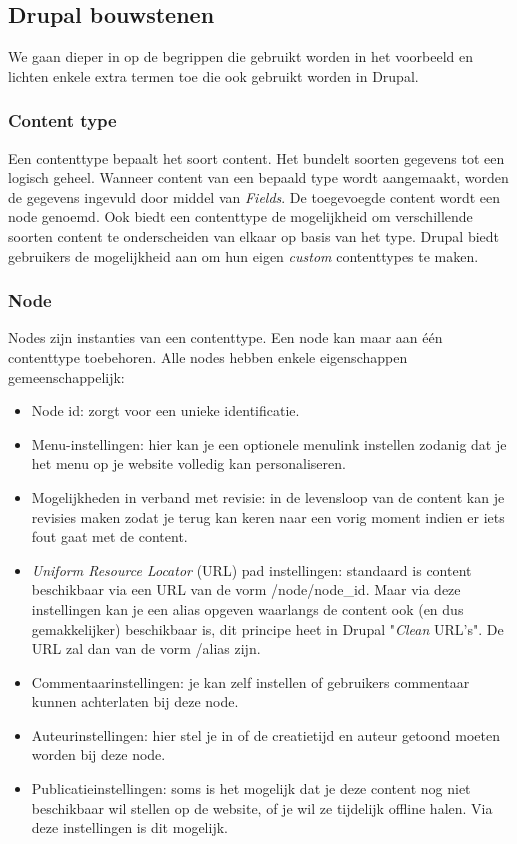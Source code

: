 \subsection{Drupal bouwstenen}

We gaan dieper in op de begrippen die gebruikt worden in het voorbeeld en lichten enkele extra termen toe die ook gebruikt worden in Drupal.

\subsubsection{Content type}
Een contenttype bepaalt het soort content. Het bundelt soorten gegevens tot een logisch geheel. Wanneer content van een bepaald type wordt aangemaakt, worden de gegevens ingevuld door middel van \textit{Fields}. De toegevoegde content wordt een node genoemd. Ook biedt een contenttype de mogelijkheid om verschillende soorten content te onderscheiden van elkaar op basis van het type.
Drupal biedt gebruikers de mogelijkheid aan om hun eigen \textit{custom} contenttypes te maken.

\subsubsection{Node}
Nodes zijn instanties van een contenttype. Een node kan maar aan \'{e}\'{e}n contenttype toebehoren.
Alle nodes hebben enkele eigenschappen gemeenschappelijk:
\begin{itemize}
\item Node id: zorgt voor een unieke identificatie.
\item Menu-instellingen: hier kan je een optionele menulink instellen zodanig dat je het menu op je website volledig kan personaliseren.
\item Mogelijkheden in verband met revisie: in de levensloop van de content kan je revisies maken zodat je terug kan keren naar een vorig moment indien er iets fout gaat met de content.
\item \textit{Uniform Resource Locator} (URL)  pad instellingen: standaard is content beschikbaar via een URL van de vorm /node/node\_id. Maar via deze instellingen kan je een alias opgeven waarlangs de content ook (en dus gemakkelijker) beschikbaar is, dit principe heet in Drupal "\textit{Clean} URL's". De URL zal dan van de vorm /alias zijn.
\item Commentaarinstellingen: je kan zelf instellen of gebruikers commentaar kunnen achterlaten bij deze node.
\item Auteurinstellingen: hier stel je in of de creatietijd en auteur getoond moeten worden bij deze node.
\item Publicatieinstellingen: soms is het mogelijk dat je deze content nog niet beschikbaar wil stellen op de website, of je wil ze tijdelijk offline halen. Via deze instellingen is dit mogelijk.
\end{itemize}

